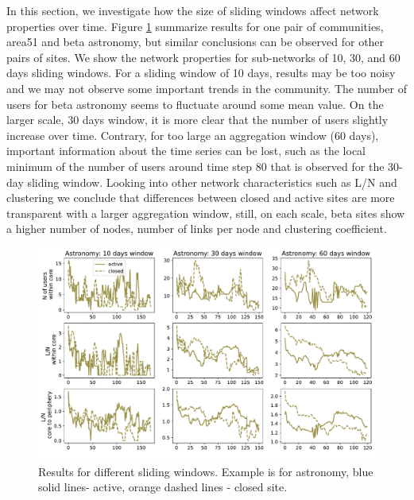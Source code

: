 In this section, we investigate how the size of sliding windows affect network properties over time. Figure \ref{fig:windows} summarize results for one pair of communities, area51 and beta astronomy, but similar conclusions can be observed for other pairs of sites. We show the network properties for sub-networks of 10, 30, and 60 days sliding windows. For a sliding window of 10 days, results may be too noisy and we may not observe some important trends in the community. The number of users for beta astronomy seems to fluctuate around some mean value. On the larger scale, 30 days window,  it is more clear that the number of users slightly increase over time. Contrary, for too large an aggregation window (60 days), important information about the time series can be lost, such as the local minimum of the number of users around time step 80 that is observed for the 30-day sliding window. Looking into other network characteristics such as L/N and clustering we conclude that differences between closed and  active sites are more transparent with a larger aggregation window, still, on each scale, beta sites show a higher number of nodes, number of links per node and clustering coefficient.

\begin{figure}[h!]
	\centering
	\includegraphics[width=\linewidth]{figures/stackexchange/sliding_window_core_periphery.pdf}
	\caption{Results for different sliding windows. Example is for astronomy, blue solid lines- active, orange dashed lines - closed site. }
	\label{fig:windows}
\end{figure}


